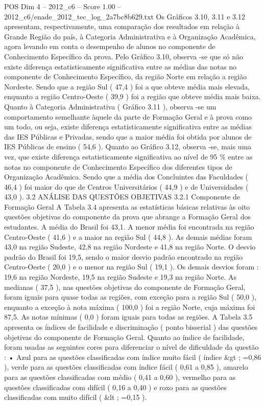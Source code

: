 \begin{textsample}{POS Dim 4 – 2012\_c6 – Score 1.00 – 2012\_c6/enade\_2012\_tec\_log\_2a7bc8b629.txt}
Os Gráficos 3.10, 3.11 e 3.12 apresentam, respectivamente, uma comparação dos resultados em relação à Grande Região do país, à Categoria Administrativa e à Organização Acadêmica, agora levando em conta o desempenho de alunos no componente de Conhecimento Específico da prova.
Pelo Gráfico 3.10, observa -se que só não existe diferença estatisticamente significativa entre as médias das notas no componente de Conhecimento Específico, da região Norte em relação a região Nordeste.
Sendo que a região Sul ( 47,4 ) foi a que obteve média mais elevada, enquanto a região Centro-Oeste ( 39,9 ) foi a região que obteve média mais baixa.
Quanto à Categoria Administrativa ( Gráfico 3.11 ), observa -se um comportamento semelhante àquele da parte de Formação Geral e à prova como um todo, ou seja, existe diferença estatisticamente significativa entre as médias das IES Públicas e Privadas, sendo que a maior média foi obtida por alunos de IES Públicas de ensino ( 54,6 ).
Quanto ao Gráfico 3.12, observa -se, mais uma vez, que existe diferença estatisticamente significativa ao nível de 95 \% entre as notas no componente de Conhecimento Específico dos diferentes tipos de Organização Acadêmica.
Sendo que a média dos Concluintes das Faculdades ( 46,4 ) foi maior do que de Centros Universitários ( 44,9 ) e de Universidades ( 43,0 ). 3.2 ANÁLISE DAS QUESTÕES OBJETIVAS 3.2.1 Componente de Formação Geral A Tabela 3.4 apresenta as estatísticas básicas relativas às oito questões objetivas do componente da prova que abrange a Formação Geral dos estudantes.
A média do Brasil foi 43,1.
A menor média foi encontrada na região Centro-Oeste ( 41,6 ) e a maior na região Sul ( 44,8 ).
As demais médias foram 43,0 na região Sudeste, 42,8 na região Nordeste e 41,8 na região Norte.
O desvio padrão do Brasil foi 19,5, sendo o maior desvio padrão encontrado na região Centro-Oeste ( 20,0 ) e o menor na região Sul ( 19,1 ).
Os demais desvios foram : 19,6 na região Nordeste, 19,5 na região Sudeste e 19,3 na região Norte.
As medianas ( 37,5 ), nas questões objetivas do componente de Formação Geral, foram iguais para quase todas as regiões, com exceção para a região Sul ( 50,0 ), enquanto a exceção à nota máxima ( 100,0 ) foi a região Norte, cuja máxima foi 87,5.
As notas mínimas ( 0,0 ) foram iguais para todas as regiões.
A Tabela 3.5 apresenta os índices de facilidade e discriminação ( ponto bisserial ) das questões objetivas do componente de Formação Geral.
Quanto ao índice de facilidade, foram usadas as seguintes cores para diferenciar o nível de dificuldade da questão : • Azul para as questões classificadas com índice muito fácil ( índice \&gt ; =0,86 ), verde para as questões classificadas com índice fácil ( 0,61 a 0,85 ), amarelo para as questões classificadas com médio ( 0,41 a 0,60 ), vermelho para as questões classificadas com difícil ( 0,16 a 0,40 ) e roxo para as questões classificadas com muito difícil ( \&lt ; =0,15 ).

\end{textsample}
